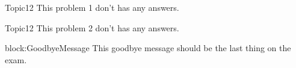 \documentclass[master]{exam}
\begin{document}
    \begin{problem}{Topic1}{2}
        This problem 1 don't has any answers.
        \begin{answers}
        \end{answers}
    \end{problem}
    
    \begin{problem}{Topic1}{2}
        This problem 2 don't has any answers.
        \begin{answers}
        \end{answers}
    \end{problem}
    
    
\begin{block}{block:GoodbyeMessage}
    This goodbye message should be the last thing on the exam.
\end{block}
    
        
\end{document}
